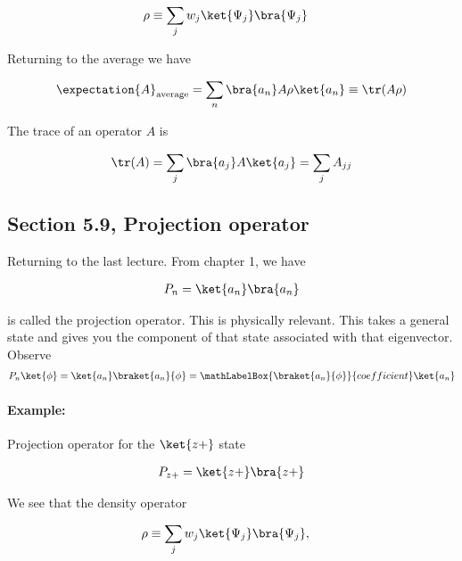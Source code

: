\begin{align}\label{eqn:PHY356HNov2:40}
\rho &\equiv \sum_j w_j \ket{\Psi_j} \bra{\Psi_j}
\end{align}

Returning to the average we have

\begin{align}\label{eqn:PHY356HNov2:50}
\expectation{A}_{\text{average}} = \sum_n \bra{a_n} A \rho \ket{a_n} \equiv \tr(A \rho)
\end{align}

The trace of an operator $A$ is

\begin{align}\label{eqn:PHY356HNov2:60}
\tr(A) = \sum_j \bra{a_j} A \ket{a_j} = \sum_j A_{jj}
\end{align}

\subsection{Section 5.9, Projection operator}

Returning to the last lecture.  From chapter 1, we have

\begin{align}\label{eqn:PHY356Foct26:1000}
P_n = \ket{a_n} \bra{a_n}
\end{align}

is called the projection operator.  This is physically relevant.  This takes a general state and gives you the component of that state associated with that eigenvector.  Observe
\begin{align}\label{eqn:PHY356Foct26:210}
P_n \ket{\phi} =
\ket{a_n} \braket{a_n}{\phi}
=
\mathLabelBox{\braket{a_n}{\phi}}{coefficient}
\ket{a_n}
\end{align}

\paragraph{Example:} Projection operator for the $\ket{z+}$ state

\begin{align}\label{eqn:PHY356Foct26:211}
P_{z+} = \ket{z+} \bra{z+}
\end{align}

We see that the density operator

\begin{align}\label{eqn:PHY356HNov2:40b}
\rho &\equiv \sum_j w_j \ket{\Psi_j} \bra{\Psi_j},
\end{align}

